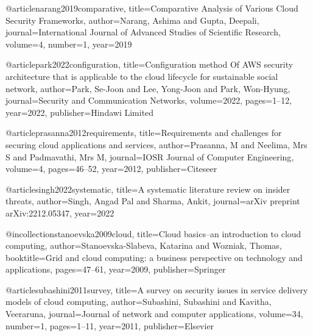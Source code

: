 @article{narang2019comparative,
  title={Comparative Analysis of Various Cloud Security Frameworks},
  author={Narang, Ashima and Gupta, Deepali},
  journal={International Journal of Advanced Studies of Scientific Research},
  volume={4},
  number={1},
  year={2019}
}








@article{park2022configuration,
  title={Configuration method Of AWS security architecture that is applicable to the cloud lifecycle for sustainable social network},
  author={Park, Se-Joon and Lee, Yong-Joon and Park, Won-Hyung},
  journal={Security and Communication Networks},
  volume={2022},
  pages={1--12},
  year={2022},
  publisher={Hindawi Limited}
}









@article{prasanna2012requirements,
  title={Requirements and challenges for securing cloud applications and services},
  author={Prasanna, M and Neelima, Mrs S and Padmavathi, Mrs M},
  journal={IOSR Journal of Computer Engineering},
  volume={4},
  pages={46--52},
  year={2012},
  publisher={Citeseer}
}











@article{singh2022systematic,
  title={A systematic literature review on insider threats},
  author={Singh, Angad Pal and Sharma, Ankit},
  journal={arXiv preprint arXiv:2212.05347},
  year={2022}
}









@incollection{stanoevska2009cloud,
  title={Cloud basics--an introduction to cloud computing},
  author={Stanoevska-Slabeva, Katarina and Wozniak, Thomas},
  booktitle={Grid and cloud computing: a business perspective on technology and applications},
  pages={47--61},
  year={2009},
  publisher={Springer}
}














@article{subashini2011survey,
  title={A survey on security issues in service delivery models of cloud computing},
  author={Subashini, Subashini and Kavitha, Veeraruna},
  journal={Journal of network and computer applications},
  volume={34},
  number={1},
  pages={1--11},
  year={2011},
  publisher={Elsevier}
}












